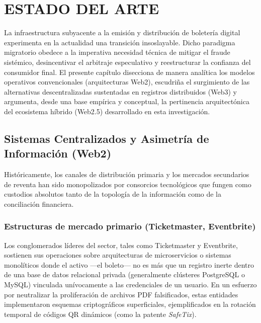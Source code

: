 \newpage
\setcounter{subsection}{0}
\section{ESTADO DEL ARTE}

La infraestructura subyacente a la emisión y distribución de boletería digital experimenta en la actualidad
una transición insoslayable. Dicho paradigma migratorio obedece a la imperativa necesidad técnica de mitigar
el fraude sistémico, desincentivar el arbitraje especulativo y reestructurar la confianza del consumidor
final. El presente capítulo disecciona de manera analítica los modelos operativos convencionales
(arquitecturas Web2), escudriña el surgimiento de las alternativas descentralizadas sustentadas en registros
distribuidos (Web3) y argumenta, desde una base empírica y conceptual, la pertinencia arquitectónica del
ecosistema híbrido (Web2.5) desarrollado en esta investigación.

\subsection{Sistemas Centralizados y Asimetría de Información (Web2)}

Históricamente, los canales de distribución primaria y los mercados secundarios de reventa han sido
monopolizados por consorcios tecnológicos que fungen como custodios absolutos tanto de la topología de la
información como de la conciliación financiera. 

\subsubsection{Estructuras de mercado primario (Ticketmaster, Eventbrite)}

Los conglomerados líderes del sector, tales como Ticketmaster \cite{ticketmaster2024} y Eventbrite, sostienen
sus operaciones sobre arquitecturas de microservicios o sistemas monolíticos donde el activo —el boleto— no
es más que un registro inerte dentro de una base de datos relacional privada (generalmente clústeres
PostgreSQL o MySQL) vinculada unívocamente a las credenciales de un usuario. En un esfuerzo por neutralizar
la proliferación de archivos PDF falsificados, estas entidades implementaron esquemas criptográficos
superficiales, ejemplificados en la rotación temporal de códigos QR dinámicos (como la patente
\textit{SafeTix}).

